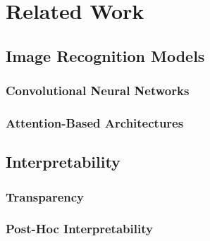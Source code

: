 \chapter{Related Work}
\chaptertoc{}


\section{Image Recognition Models}

\subsection{Convolutional Neural Networks}

\subsection{Attention-Based Architectures}


\section{Interpretability}

\subsection{Transparency}

\subsection{Post-Hoc Interpretability}



